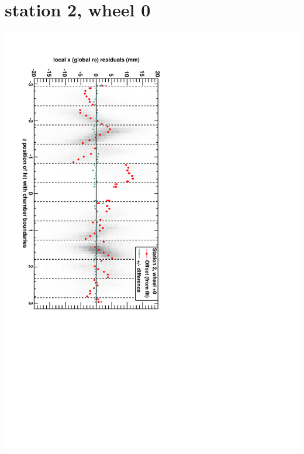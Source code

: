 \documentclass[compress]{beamer}
\begin{document}
\section*{station 2, wheel 0}
\begin{frame} \vfill \mbox{\hspace{-1 cm}\includegraphics[height=1.2\linewidth, angle=90]{DTrphiVsPhi_st2_whC.pdf}} \end{frame}
\end{document}
